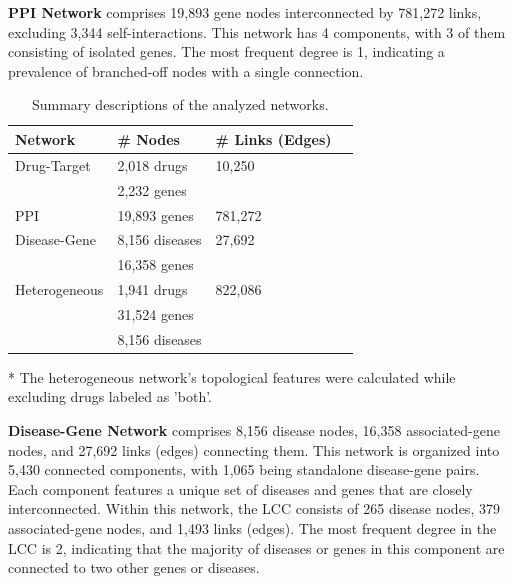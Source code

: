 \documentclass[journal,twoside,web]{ieeecolor}
\begin{document}
\textbf{PPI Network}
comprises 19,893 gene nodes interconnected by 781,272 links, excluding 3,344 self-interactions.
This network has 4 components, with 3 of them consisting of isolated genes.
The most frequent degree is 1, indicating a prevalence of branched-off nodes with a single connection.

\begin{table}
\caption{Summary descriptions of the analyzed networks.
\label{tbl:networkFeatures}}%
\begin{threeparttable}
\begin{tabular*}{\columnwidth}{@{\extracolsep\fill}llll@{\extracolsep\fill}}
\toprule
Network & \# Nodes  & \# Links (Edges)\\
\midrule
Drug-Target               & 2,018 drugs    & 10,250\\
                          & 2,232 genes            \\
\midrule
PPI                       & 19,893 genes   & 781,272\\
\midrule
Disease-Gene              & 8,156 diseases & 27,692\\
                          & 16,358 genes           \\  
\midrule
Heterogeneous\tnote{*}    & 1,941 drugs   & 822,086\\
                          & 31,524 genes           \\
                          & 8,156 diseases         \\
\bottomrule
\end{tabular*}
\begin{tablenotes}
\item[*] The heterogeneous network's topological features were calculated while excluding drugs labeled as 'both'.
\end{tablenotes}
\end{threeparttable}
\end{table}




\textbf{Disease-Gene Network}
comprises 8,156 disease nodes, 16,358 associated-gene nodes, and 27,692 links (edges) connecting them.
This network is organized into 5,430 connected components, with 1,065 being standalone disease-gene pairs.
Each component features a unique set of diseases and genes that are closely interconnected.
Within this network, the LCC consists of 265 disease nodes, 379 associated-gene nodes, and 1,493 links (edges).
The most frequent degree in the LCC is 2, indicating that the majority of diseases or genes in this component are connected to two other genes or diseases.
\end{document}
